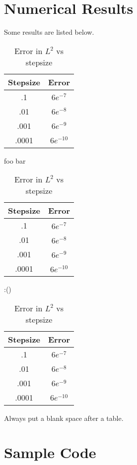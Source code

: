 \documentclass[11pt]{article}
\numberwithin{equation}{section}
\theoremstyle{definition}
\begin{document}
\section{Numerical Results}
Some results are listed below.
\begin{table}[H]
  \caption{Error in $L^2$ vs stepsize}
  \label{some_table}
  \begin{center}
  \begin{tabular}{|c|c|}
  \hline
  Stepsize & Error \\ \hline
  .1 & $6e^{-7}$ \\ \hline
  .01 & $6e^{-8}$ \\ \hline
  .001 & $6e^{-9}$ \\ \hline
  .0001 & $6e^{-10}$ \\
  \hline
  \end{tabular}
  \end{center}
\end{table}
foo bar
\begin{table}[H]
  \caption{Error in $L^2$ vs stepsize}
  \label{some_table_2}
  \begin{center}
  \begin{tabular}{|c|c|}
  \hline
  Stepsize & Error \\ \hline
  .1 & $6e^{-7}$ \\ \hline
  .01 & $6e^{-8}$ \\ \hline
  .001 & $6e^{-9}$ \\ \hline
  .0001 & $6e^{-10}$ \\
  \hline
  \end{tabular}
  \end{center}
\end{table}
:()
\begin{table}[H]
  \caption{Error in $L^2$ vs stepsize}
  \label{some_table_3}
  \begin{center}
  \begin{tabular}{|c|c|}
  \hline
  Stepsize & Error \\ \hline
  .1 & $6e^{-7}$ \\ \hline
  .01 & $6e^{-8}$ \\ \hline
  .001 & $6e^{-9}$ \\ \hline
  .0001 & $6e^{-10}$ \\
  \hline
  \end{tabular}
  \end{center}
\end{table}
Always put a blank space after a table.


\newpage
\section{Sample Code}
\end{document}

